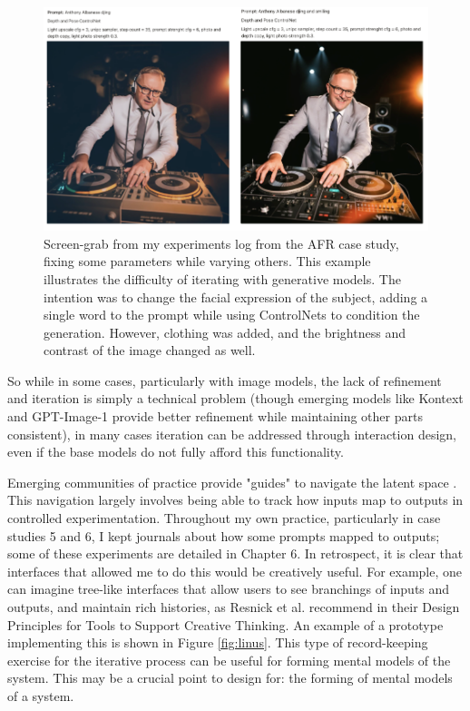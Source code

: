\begin{figure}[H]
    \centering
    \includegraphics[width=1\linewidth]{alboexperiments.png}
    \caption{Screen-grab from my experiments log from the AFR case study, fixing some parameters while varying others. This example illustrates the difficulty of iterating with generative models. The intention was to change the facial expression of the subject, adding a single word to the prompt while using ControlNets to condition the generation. However, clothing was added, and the brightness and contrast of the image changed as well.}
    \label{fig:albo_series}
\end{figure}

So while in some cases, particularly with image models, the lack of refinement and iteration is simply a technical problem (though emerging models like Kontext and GPT-Image-1 provide better refinement while maintaining other parts consistent), in many cases iteration can be addressed through interaction design, even if the base models do not fully afford this functionality.

Emerging communities of practice provide "guides" to navigate the latent space \cite{Smith2022-dm}. This navigation largely involves being able to track how inputs map to outputs in controlled experimentation. Throughout my own practice, particularly in case studies 5 and 6, I kept journals about how some prompts mapped to outputs; some of these experiments are detailed in Chapter 6. In retrospect, it is clear that interfaces that allowed me to do this would be creatively useful. For example, one can imagine tree-like interfaces that allow users to see branchings of inputs and outputs, and maintain rich histories, as Resnick et al. \cite{Resnick2005-fs} recommend in their Design Principles for Tools to Support Creative Thinking. An example of a prototype implementing this is shown in Figure \ref{fig:linus}. This type of record-keeping exercise for the iterative process can be useful for forming mental models of the system. This may be a crucial point to design for: the forming of mental models of a system.

